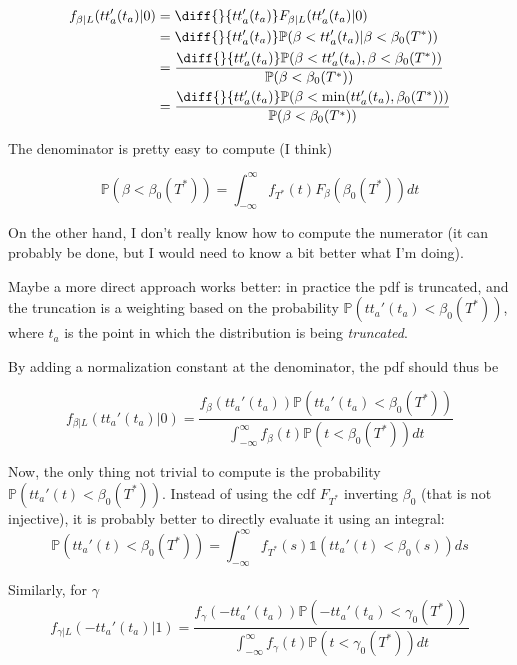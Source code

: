 \documentclass{article}
\begin{document}
\begin{align*}
  f_{\beta | L}(tt_a'(t_a) | 0) & = \diff{}{tt_a'(t_a)}F_{\beta | L}(tt_a'(t_a) | 0) \\
  & = \diff{}{tt_a'(t_a)}\mathbb{P}(\beta < tt_a'(t_a) | \beta < \beta_0(T^*)) \\
  & = \frac{\diff{}{tt_a'(t_a)}\mathbb{P}(\beta < tt_a'(t_a), \beta < \beta_0(T^*))}{\mathbb{P}(\beta < \beta_0(T^*))} \\
  & = \frac{\diff{}{tt_a'(t_a)}\mathbb{P}(\beta < \min(tt_a'(t_a), \beta_0(T^*)))}{\mathbb{P}(\beta < \beta_0(T^*))}
\end{align*}

The denominator is pretty easy to compute (I think)

\begin{equation*}
  \mathbb{P}(\beta < \beta_0(T^*)) = \int_{-\infty}^\infty f_{T^*}(t) F_\beta(\beta_0(T^*)) dt
\end{equation*}

On the other hand, I don't really know how to compute the numerator (it can probably be done, but I would need to know a bit better what I'm doing).

Maybe a more direct approach works better:
in practice the pdf is truncated, and the truncation is a weighting based on the probability \(\mathbb{P}(tt_a'(t_a) < \beta_0(T^*))\), where \(t_a\) is the point in which the distribution is being \textit{truncated}.

By adding a normalization constant at the denominator, the pdf should thus be

\begin{equation}
  \label{eq:pdf_beta_early}
  f_{\beta | L}(tt_a'(t_a) | 0) = \frac{f_\beta(tt_a'(t_a))\mathbb{P}(tt_a'(t_a) < \beta_0(T^*))}{\int_{-\infty}^\infty f_\beta(t)\mathbb{P}(t < \beta_0(T^*)) dt}
\end{equation}

Now, the only thing not trivial to compute is the probability \(\mathbb{P}(tt_a'(t) < \beta_0(T^*))\).
Instead of using the cdf \(F_{T^*}\) inverting \(\beta_0\) (that is not injective), it is probably better to directly evaluate it using an integral:
\begin{equation*}
  \mathbb{P}(tt_a'(t) < \beta_0(T^*)) = \int_{-\infty}^\infty f_{T^*}(s) \mathbb{1}(tt_a'(t) < \beta_0(s)) ds
\end{equation*}

Similarly, for \(\gamma\)
\begin{equation*}
  f_{\gamma | L}(-tt_a'(t_a) | 1) = \frac{f_\gamma(-tt_a'(t_a))\mathbb{P}(-tt_a'(t_a) < \gamma_0(T^*))}{\int_{-\infty}^\infty f_\gamma(t)\mathbb{P}(t < \gamma_0(T^*)) dt}
\end{equation*}
\end{document}
